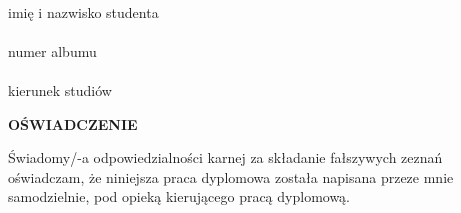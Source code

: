 \documentclass[10pt,twoside,a4paper]{article}
\begin{document}
		\begin{flushleft}
			\begin{minipage}{0.33\linewidth}
				\begin{flushleft}
					\dotfill \\  \vspace{-5pt}
					imię i nazwisko studenta \\
					\vspace{10pt}
					\dotfill \\  \vspace{-5pt}
					numer albumu \\
					\vspace{10pt}
					\dotfill \\  \vspace{-5pt}
					kierunek studiów
				\end{flushleft}
			\end{minipage}
		\end{flushleft}
		\vspace{15 pt}
		\begin{center}
			{\fontsize{12}{14.5}\textbf{OŚWIADCZENIE}			}
		\end{center}
		Świadomy/-a odpowiedzialności karnej za składanie fałszywych zeznań oświadczam,  
		że niniejsza praca dyplomowa została napisana przeze mnie samodzielnie, pod opieką kierującego pracą dyplomową. 		
		
\end{document}
